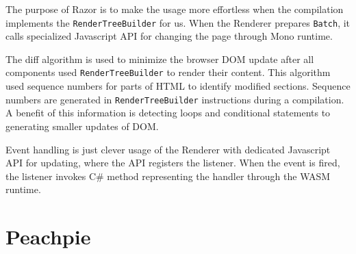 The purpose of Razor is to make the usage more effortless when the compilation implements the \texttt{RenderTreeBuilder} for us.
When the Renderer prepares \texttt{Batch}, it calls specialized Javascript API for changing the page through Mono runtime.
\par
The diff algorithm is used to minimize the browser DOM  update after all components used \texttt{RenderTreeBuilder} to render their content.
This algorithm used sequence numbers for parts of HTML to identify modified sections.
Sequence numbers are generated in \texttt{RenderTreeBuilder} instructions during a compilation.
A benefit of this information is detecting loops and conditional statements to generating smaller updates of DOM.  
\par
Event handling is just clever usage of the Renderer with dedicated Javascript API for updating, where the API registers the listener.
When the event is fired, the listener invokes C\# method representing the handler through the WASM runtime.

\section{Peachpie}

